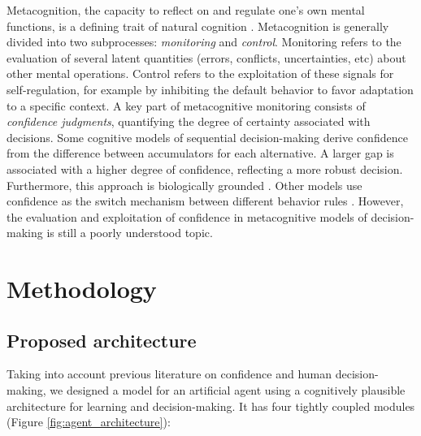 \documentclass[runningheads]{llncs}
\begin{document}
Metacognition, the capacity to reflect on and regulate one's own mental functions, is a defining trait of natural cognition \cite{flemingMetacognitionConfidenceReview}. Metacognition is generally divided into two subprocesses: \textit{monitoring} and \textit{control}. Monitoring refers to the evaluation of several latent quantities (errors, conflicts, uncertainties, etc) about other mental operations. Control refers to the exploitation of these signals for self-regulation, for example by inhibiting the default behavior to favor adaptation to a specific context. A key part of metacognitive monitoring consists of \textit{confidence judgments}, quantifying the degree of certainty associated with decisions. Some cognitive models of sequential decision-making derive confidence from the difference between accumulators for each alternative. A larger gap is associated with a higher degree of confidence, reflecting a more robust decision. Furthermore, this approach is biologically grounded \cite{kepecsNeuralCorrelatesComputation2008}. Other models use confidence as the switch mechanism between different behavior rules \cite{collinsReasoningLearningCreativity2012}. However, the evaluation and exploitation of confidence in metacognitive models of decision-making is still a poorly understood topic.

\section{Methodology}

\subsection{Proposed architecture}

Taking into account previous literature on confidence and human decision-making, we designed a model for an artificial agent using a cognitively plausible architecture for learning and decision-making. It has four tightly coupled modules (Figure \ref{fig:agent_architecture}):
\end{document}
